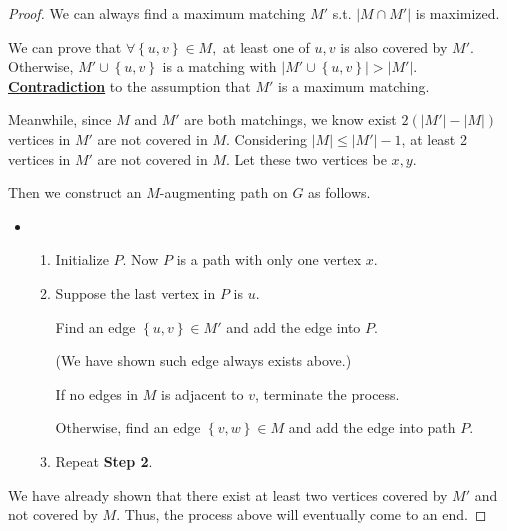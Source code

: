 \documentclass{article}
\newcommand{\set}[1]{\left\{#1\right\}}
\begin{document}
\begin{proof}
    \hspace{1.3em}
    We can always find a maximum matching $M'$ s.t. $|M\cap M'|$ is maximized. 

    \hspace{1.3em}
    We can prove that $\forall \set{u,v}\in M,$ at least one of $u,v$ is also covered by $M'$. Otherwise, $M'\cup\set{u,v}$ is a matching with $|M'\cup\set{u,v}|>|M'|$. \underline{\textbf{Contradiction}} to the assumption that $M'$ is a maximum matching.
    
    \hspace{1.3em}
    Meanwhile, since $M$ and $M'$ are both matchings, we know exist $2(|M'|-|M|)$ vertices in $M'$ are not covered in $M$. Considering $|M|\le|M'|-1$, at least 2 vertices in $M'$ are not covered in $M$. Let these two vertices be $x,y$.
    
    \hspace{1.3em}
    Then we construct an $M$-augmenting path on $G$ as follows.
    
    \vspace{-0.5em}
    \begin{itemize}
        \item[] \begin{enumerate}
        \item Initialize $P$. Now $P$ is a path with only one vertex $x$.
        \item Suppose the last vertex in $P$ is $u$. 
        
        Find an edge $\set{u,v}\in M'$ and add the edge into $P$. 
        
        (We have shown such edge always exists above.)
        
        If no edges in $M$ is adjacent to $v$, terminate the process. 
        
        Otherwise, find an edge $\set{v,w}\in M$ and add the edge into path $P$. 
        
        \item Repeat \textbf{Step 2}.
    \end{enumerate}
    
    \end{itemize}
    
    \vspace{-0.5em} \hspace{1.3em}
    We have already shown that there exist at least two vertices covered by $M'$ and not covered by $M$. Thus, the process above will eventually come to an end.
    

\end{proof}
\end{document}

